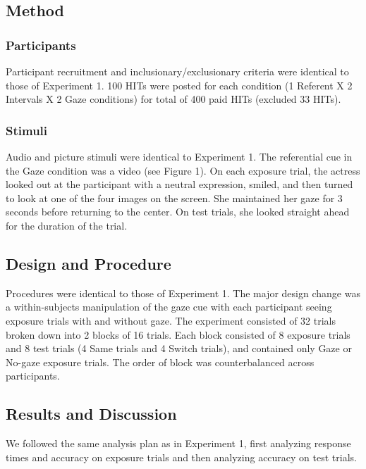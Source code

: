\documentclass[authoryear, review]{elsarticle}
\begin{document}
\subsection{Method}\label{method-1}

\subsubsection{Participants}\label{participants-1}

Participant recruitment and inclusionary/exclusionary criteria were
identical to those of Experiment 1. 100 HITs were posted for each
condition (1 Referent X 2 Intervals X 2 Gaze conditions) for total of
400 paid HITs (excluded 33 HITs).

\subsubsection{Stimuli}\label{stimuli-1}

Audio and picture stimuli were identical to Experiment 1. The
referential cue in the Gaze condition was a video (see Figure 1). On
each exposure trial, the actress looked out at the participant with a
neutral expression, smiled, and then turned to look at one of the four
images on the screen. She maintained her gaze for 3 seconds before
returning to the center. On test trials, she looked straight ahead for
the duration of the trial.

\subsection{Design and Procedure}\label{design-and-procedure-1}

Procedures were identical to those of Experiment 1. The major design
change was a within-subjects manipulation of the gaze cue with each
participant seeing exposure trials with and without gaze. The experiment
consisted of 32 trials broken down into 2 blocks of 16 trials. Each
block consisted of 8 exposure trials and 8 test trials (4 Same trials
and 4 Switch trials), and contained only Gaze or No-gaze exposure
trials. The order of block was counterbalanced across participants.

\subsection{Results and Discussion}\label{results-and-discussion-1}

We followed the same analysis plan as in Experiment 1, first analyzing
response times and accuracy on exposure trials and then analyzing
accuracy on test trials.
\end{document}
